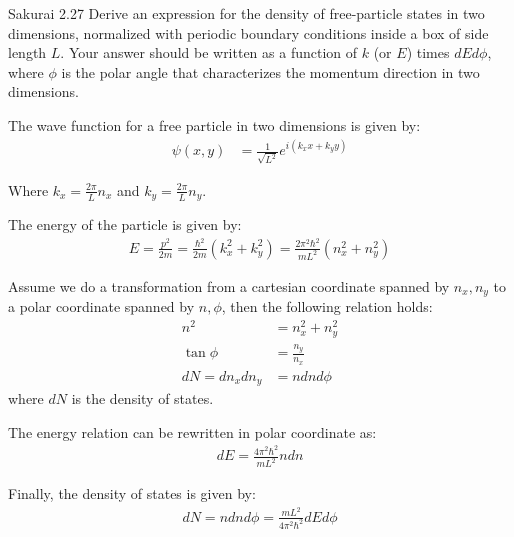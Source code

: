 \documentclass{article}
\begin{document}
\newpage
\begin{section}{Sakurai 2.27}
Derive an expression for the density of free-particle states in two dimensions, normalized with periodic boundary conditions inside a box of side length $L$. Your answer should be written as a function of $k$ (or $E$) times $dE d\phi$, where $\phi$ is the polar angle that characterizes the momentum direction in two dimensions.

\begin{tcolorbox}[breakable]
	The wave function for a free particle in two dimensions is given by:
	\begin{align*}
		\psi(x,y) & = \frac{1}{\sqrt{L^2}} e^{i(k_x x + k_y y)}
	\end{align*}

	Where $k_x = \frac{2\pi}{L} n_x$ and $k_y = \frac{2\pi}{L} n_y$.

	The energy of the particle is given by:
	\begin{align*}
		E = \frac{p^2}{2m} = \frac{\hbar^2}{2m} (k_x^2 + k_y^2) = \frac{2\pi^2 \hbar^2}{m L^2} (n_x^2 + n_y^2)
	\end{align*}

	Assume we do a transformation from a cartesian coordinate spanned by $n_x, n_y$ to a polar coordinate spanned by $n, \phi$, then the following relation holds:
	\begin{align*}
		n^2            & = n_x^2 + n_y^2   \\
		\tan \phi      & = \frac{n_y}{n_x} \\
		dN = dn_x dn_y & = n dn d\phi
	\end{align*}
	where $dN$ is the density of states.

	The energy relation can be rewritten in polar coordinate as:
	\begin{align*}
		dE = \frac{4\pi^2 \hbar^2}{m L^2} n dn
	\end{align*}

	Finally, the density of states is given by:
	\begin{align*}
		dN = n dn d\phi = \frac{mL^2}{4\pi^2 \hbar^2} dE d\phi
	\end{align*}
\end{tcolorbox}
\end{section}
\end{document}
